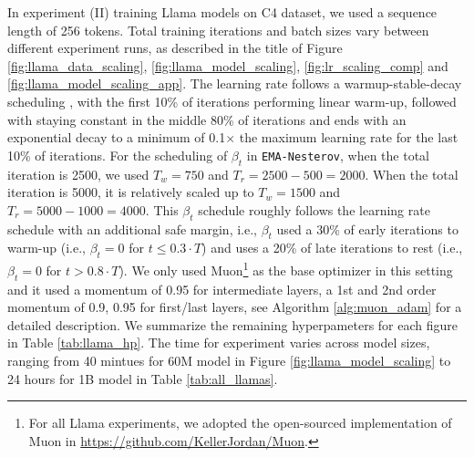 \documentclass{article}
\theoremstyle{plain}
\theoremstyle{definition}
\theoremstyle{remark}
\def\algname{{\tt EMA-Nesterov}}
\begin{document}
In experiment (II) training Llama models on C4 dataset, we used a sequence length of 256 tokens. Total training iterations and batch sizes vary between different experiment runs, as described in the title of Figure \ref{fig:llama_data_scaling}, \ref{fig:llama_model_scaling}, \ref{fig:lr_scaling_comp} and \ref{fig:llama_model_scaling_app}. 
The learning rate follows a warmup-stable-decay scheduling \citep{hu2024minicpm}, with the first 10\% of iterations performing linear warm-up, followed with staying constant in the middle 80\% of iterations and ends with an exponential decay to a minimum of 0.1$\times$ the maximum learning rate for the last 10\% of iterations. 
For the scheduling of $\beta_t$ in {\algname}, when the total iteration is 2500, we used $T_w = 750$ and $T_r = 2500 - 500 = 2000$. When the total iteration is 5000, it is relatively scaled up to $T_w = 1500$ and $T_r = 5000 - 1000 = 4000$. This $\beta_t$ schedule roughly follows the learning rate schedule with an additional safe margin, i.e., $\beta_t$ used a 30\% of early iterations to warm-up (i.e., $\beta_t=0$ for $t \leq 0.3\cdot  T$) and uses a 20\% of late iterations to rest (i.e., $\beta_t = 0$ for $t > 0.8\cdot T$). 
We only used Muon\footnote{For all Llama experiments, we adopted the open-sourced implementation of Muon in \url{https://github.com/KellerJordan/Muon}.} as the base optimizer in this setting and it used a momentum of 0.95 for intermediate layers, a 1st and 2nd order momentum of 0.9, 0.95 for first/last layers, see Algorithm \ref{alg:muon_adam} for a detailed description. We summarize the remaining hyperpameters for each figure in Table \ref{tab:llama_hp}. The time for experiment varies across model sizes, ranging from 40 mintues for 60M model in Figure \ref{fig:llama_model_scaling} to 24 hours for 1B model in Table \ref{tab:all_llamas}.
\newpage
\end{document}
